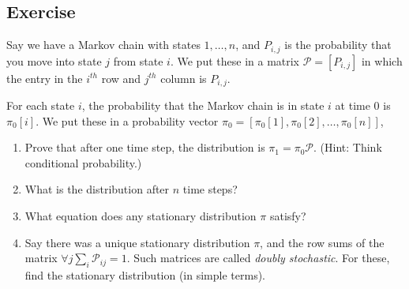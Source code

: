 \documentclass{article}
\newcounter{counter}
\newcommand{\Exercise}{Exercise \stepcounter{counter}\thecounter}
\begin{document}

\subsection*{\Exercise}
  Say we have a Markov chain with states $1,\ldots, n$, and $P_{i,j}$ is
  the probability that you move into state $j$ from state $i$.
  We put these in a matrix $\mathcal{P} = [ P_{i,j} ]$ in which the entry in
  the $i^{th}$ row and $j^{th}$ column is $P_{i,j}$.
  
  For each state $i$, the probability that the Markov chain is in state $i$
  at time $0$ is $\pi_0[i]$. We put these in a probability vector
  $\pi_0 = [ \pi_0[1], \pi_0[2], \ldots , \pi_0[n]]$,
  \begin{enumerate}[label=(\alph*)]
    \item Prove that after one time step, the distribution is $\pi_1 =
     \pi_0 \mathcal{P}$.
      (Hint: Think conditional probability.)
    \item What is the distribution after $n$ time steps?
    \item What equation does any stationary distribution $\pi$ satisfy?
    \item Say there was a unique stationary distribution $\pi$, and
      the row sums of the matrix $\forall j \sum_i \mathcal{P}_{ij} = 1$.
      Such matrices are called \emph{doubly stochastic}. For these,
      find the stationary distribution (in simple terms).
  \end{enumerate}
  
\end{document}
